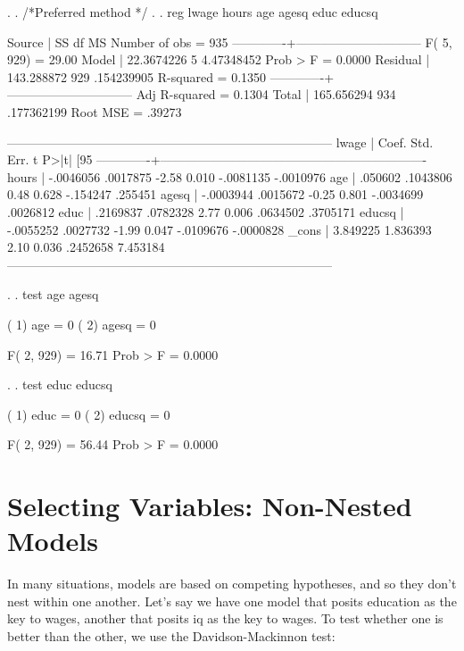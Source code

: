 \documentclass[12pt]{article}
\begin{document}
\begin{stlog}
  
. 
. /*Preferred method */
. 
. reg lwage hours age agesq educ educsq

      Source |       SS       df       MS              Number of obs =     935
-------------+------------------------------           F(  5,   929) =   29.00
       Model |  22.3674226     5  4.47348452           Prob > F      =  0.0000
    Residual |  143.288872   929  .154239905           R-squared     =  0.1350
-------------+------------------------------           Adj R-squared =  0.1304
       Total |  165.656294   934  .177362199           Root MSE      =  .39273

------------------------------------------------------------------------------
       lwage |      Coef.   Std. Err.      t    P>|t|     [95%
-------------+----------------------------------------------------------------
       hours |  -.0046056   .0017875    -2.58   0.010    -.0081135   -.0010976
         age |    .050602   .1043806     0.48   0.628     -.154247     .255451
       agesq |  -.0003944   .0015672    -0.25   0.801    -.0034699    .0026812
        educ |   .2169837   .0782328     2.77   0.006     .0634502    .3705171
      educsq |  -.0055252   .0027732    -1.99   0.047    -.0109676   -.0000828
       _cons |   3.849225   1.836393     2.10   0.036     .2452658    7.453184
------------------------------------------------------------------------------

. 
. test age agesq

 ( 1)  age = 0
 ( 2)  agesq = 0

       F(  2,   929) =   16.71
            Prob > F =    0.0000

. 
. test educ educsq

 ( 1)  educ = 0
 ( 2)  educsq = 0

       F(  2,   929) =   56.44
            Prob > F =    0.0000


\end{stlog}

\section{Selecting Variables: Non-Nested Models}
\label{sec:select-vari-non}

In many situations, models are based on competing hypotheses, and so
they don't nest within one another. Let's say we have one model that
posits education as the key to wages, another that posits iq as the
key to wages. To test whether one is better than the other, we use the
Davidson-Mackinnon test:
\end{document}
